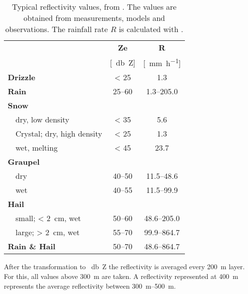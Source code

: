 \begin{table}[h]
	\begin{center}
		\caption{Typical reflectivity values, from \cite{doviak_doppler_1993}. The values are obtained from measurements, models and observations. The rainfall rate $R$ is calculated with . }\label{tab:ref_values}
		\begin{tabular}{ll|c|c}
			\hline \hline
			\multicolumn{2}{l|}{} & \textbf{Ze} & \textbf{R} \\ 
			\multicolumn{2}{l|}{} & [\SI{}{\decibel Z}] & [\SI{}{\mm\per\hour}] \\ \hline \hline
			\multicolumn{2}{l|}{\textbf{Drizzle}} & \num{< 25} &  \num{1.3} \\ \hline
			\multicolumn{2}{l|}{\textbf{Rain}} & \numrange{25}{60} & \numrange{1.3}{205.0} \\ \hline
			\multicolumn{2}{l|}{\textbf{Snow}} &  \\ 
			& dry, low density 	& \num{< 35} & \num{5.6}\\ \hline
			& Crystal; dry, high density & \num{< 25} & \num{1.3}\\ \hline
			& wet, melting 		& \num{< 45} & \num{23.7} \\ \hline
			\multicolumn{2}{l|}{\textbf{Graupel}} & \\
			& dry 				& \numrange{40}{50} & \numrange{11.5}{48.6} \\ \hline
			& wet				& \numrange{40}{55} & \numrange{11.5}{99.9} \\ \hline
			\multicolumn{2}{l|}{\textbf{Hail}} & \\
			& small; \SI{< 2}{\cm}, wet & \numrange{50}{60} & \numrange{48.6}{205.0}\\
			& large; \SI{> 2}{\cm}, wet & \numrange{55}{70} & \numrange{99.9}{864.7}\\ \hline
			\multicolumn{2}{l|}{\textbf{Rain \& Hail}} & \numrange{50}{70} & \numrange{48.6}{864.7} \\ 
			\hline \hline
		\end{tabular}
	\end{center}
\end{table}

After the transformation to \SI{}{\decibel Z} the reflectivity is averaged every \SI{200}{\metre} layer. For this, all values above \SI{300}{\metre} are taken. A reflectivity represented at \SI{400}{\metre} represents the average reflectivity between \SIrange{300}{500}{\metre}. 

